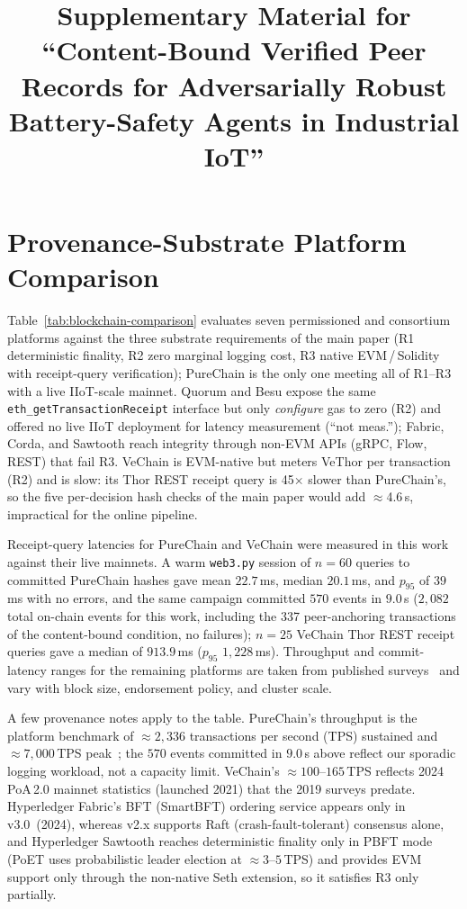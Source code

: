 \documentclass[journal]{IEEEtran}
\title{Supplementary Material for\\
       ``Content-Bound Verified Peer Records for Adversarially Robust
       Battery-Safety Agents in Industrial IoT''}
\author{%
\IEEEauthorblockN{Mohamed Abubakar Dini Rage, Muhammad Sannan Khaliq,
                  Md Mehedi Hasan Somrat, \\
                  Subroto Kumar Ghosh, Dong-Seong Kim, Jae Min Lee}%
}
\begin{document}
\maketitle

\section{Provenance-Substrate Platform Comparison}
\label{sec:supp-platforms}

Table~\ref{tab:blockchain-comparison} evaluates seven permissioned and
consortium platforms against the three substrate requirements of the
main paper (R1 deterministic finality, R2 zero marginal logging cost,
R3 native EVM\,/\,Solidity with receipt-query verification); PureChain
is the only one meeting all of R1--R3 with a live IIoT-scale mainnet.
Quorum and Besu expose the same
\texttt{eth\_getTransactionReceipt} interface but only \emph{configure}
gas to zero (R2) and offered no live IIoT deployment for latency
measurement (``not meas.''); Fabric, Corda, and Sawtooth reach
integrity through non-EVM APIs (gRPC, Flow, REST) that fail R3.
VeChain is EVM-native but meters VeThor per transaction (R2) and is
slow: its Thor REST receipt query is 45$\times$ slower than
PureChain's, so the five per-decision hash checks of the main paper
would add ${\approx}$4.6\,s, impractical for the online pipeline.

Receipt-query latencies for PureChain and VeChain were measured in
this work against their live mainnets.  A warm \texttt{web3.py}
session of $n=60$ queries to committed PureChain hashes gave mean
$22.7$\,ms, median $20.1$\,ms, and $p_{95}$ of $39$\,ms with no
errors, and the same campaign committed $570$ events in $9.0$\,s
($2{,}082$ total on-chain events for this work, including the 337
peer-anchoring transactions of the content-bound condition, no
failures); $n=25$ VeChain Thor REST receipt queries gave a median of
$913.9$\,ms ($p_{95}$ $1{,}228$\,ms).  Throughput and commit-latency
ranges for the remaining platforms are taken from published
surveys~\cite{belotti2019vademecum,liu2019performance} and vary with
block size, endorsement policy, and cluster scale.

A few provenance notes apply to the table.  PureChain's throughput is
the platform benchmark of ${\approx}2{,}336$ transactions per second
(TPS) sustained and ${\approx}7{,}000$\,TPS
peak~\cite{kim2026purechain}; the $570$ events committed in $9.0$\,s
above reflect our sporadic logging workload, not a capacity limit.
VeChain's ${\approx}100$--$165$\,TPS reflects 2024 PoA\,2.0 mainnet
statistics (launched 2021) that the 2019 surveys predate.
Hyperledger Fabric's BFT (SmartBFT) ordering service appears only in
v3.0~(2024), whereas v2.x supports Raft (crash-fault-tolerant)
consensus alone, and Hyperledger Sawtooth reaches deterministic
finality only in PBFT mode (PoET uses probabilistic leader election at
${\approx}3$--$5$\,TPS) and provides EVM support only through the
non-native Seth extension, so it satisfies R3 only partially.
\end{document}
